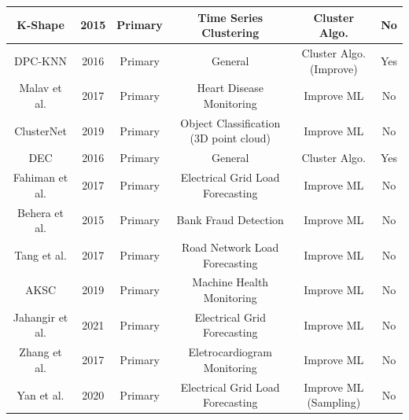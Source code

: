 \begin{table}[!ht]
\begin{adjustwidth}{-1.5cm}{}
{\begin{minipage}{\textwidth}
\begin{tabular}{@{}cccccc@{}}
    K-Shape \cite{Paparrizos.Gravano_kShapeEfficientAccurate_2015a}          & 2015          & Primary       & Time Series Clustering                 & Cluster Algo.                   & No          \\ \midrule
    DPC-KNN \cite{Du.Ding.ea_Studydensitypeaks_2016}         & 2016          & Primary       & General                                & Cluster Algo. (Improve)         & Yes         \\ \midrule
    Malav et al. \cite{Malav.Kadam.ea_PREDICTIONHEARTDISEASE_2017}     & 2017          & Primary       & Heart Disease Monitoring               & Improve ML                      & No          \\ \midrule
    ClusterNet \cite{Chen.Li.ea_ClusterNetDeepHierarchical_2019}      & 2019          & Primary       & Object Classification (3D point cloud) & Improve ML                      & No          \\ \midrule
    DEC \cite{Xie.Girshick.ea_UnsupervisedDeepEmbedding_2016}             & 2016          & Primary       & General                                & Cluster Algo.                   & Yes         \\ \midrule
    Fahiman et al. \cite{Fahiman.Erfani.ea_Improvingloadforecasting_2017}   & 2017          & Primary       & Electrical Grid Load Forecasting       & Improve ML                      & No          \\ \midrule
    Behera et al. \cite{Behera.Panigrahi_CreditCardFraud_2015}    & 2015          & Primary       & Bank Fraud Detection                   & Improve ML                      & No          \\ \midrule
    Tang et al. \cite{Tang.Liu.ea_ImprovedFuzzyNeural_2017}     & 2017          & Primary       & Road Network Load Forecasting          & Improve ML                      & No          \\ \midrule
    AKSC \cite{Cheng.Zhu.ea_MachineHealthMonitoring_2019}            & 2019          & Primary       & Machine Health Monitoring              & Improve ML                      & No          \\ \midrule
    Jahangir et al. \cite{Jahangir.Tayarani.ea_DeepLearningBasedForecasting_2021} & 2021          & Primary       & Electrical Grid Forecasting            & Improve ML                      & No          \\ \midrule
    Zhang et al. \cite{Zhang.Wang.ea_PatientspecificECGclassification_2017}    & 2017          & Primary       & Eletrocardiogram Monitoring            & Improve ML                      & No          \\ \midrule
    Yan et al. \cite{Yang.Li.ea_BayesianDeepLearningBased_2020}      & 2020          & Primary       & Electrical Grid Load Forecasting       & Improve ML (Sampling)           & No          \\ \bottomrule
    \end{tabular}
\end{minipage}}
\end{adjustwidth}
    \end{table}

